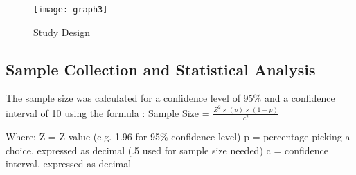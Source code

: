 \begin{figure}[h!]
	\centering
	\texttt{[image: graph3]}
	\caption{Study Design}	
	\label{fig:studydesign}	
\end{figure}
 


\subsection{Sample Collection and Statistical Analysis}

The sample size was calculated for a confidence level of 95\% and a confidence interval of 10 using the formula \cite{pmid12653925}: 
Sample Size =	$\frac{Z^2 \times (p) \times (1-p)}{c^2}$


Where:
Z = Z value (e.g. 1.96 for 95\% confidence level) 
p = percentage picking a choice, expressed as decimal (.5 used for sample size needed)
c = confidence interval, expressed as decimal 

